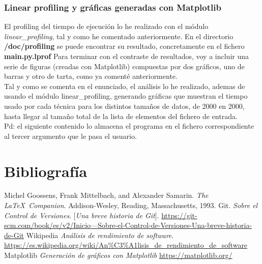 \documentclass[12 pt]{article}
\begin{document}


\subsubsection{Linear profiling y gráficas generadas con Matplotlib}
El profiling del tiempo de ejecución lo he realizado con el módulo \emph{linear\_profiling}, tal y como he comentado anteriormente. En el directorio \textbf{/doc/profiling} se puede encontrar su resultado, concretamente en el fichero \textbf{main.py.lprof}
Para terminar con el contraste de resultados, voy a incluir una serie de figuras (creadas con Matplotlib) compuestas por dos gráficos, uno de barras y otro de tarta, como ya comenté anteriormente.\\

Tal y como se comenta en el enunciado, el análisis lo he realizado, ademas de usando el módulo linear\_profiling, generando gráficas que muestran el tiempo usado por cada técnica para los distintos tamaños de datos, de 2000 en 2000, hasta llegar al tamaño total de la lista de elementos del fichero de entrada.\\

Pd: el siguiente contenido lo almacena el programa en el fichero correspondiente al tercer argumento que le pasa el usuario.\\



\section{Bibliografía}
\begin{thebibliography}{9}
Michel Goossens, Frank Mittelbach, and Alexander Samarin. 
\textit{The \LaTeX\ Companion}. 
Addison-Wesley, Reading, Massachusetts, 1993.
Git.
\textit{Sobre el Control de Versiones}.
[\textit{Una breve historia de Git}]. 
\href{https://git-scm.com/book/es/v2/Inicio---Sobre-el-Control-de-Versiones-Una-breve-historia-de-Git}{https://git-scm.com/book/es/v2/Inicio---Sobre-el-Control-de-Versiones-Una-breve-historia-de-Git}
Wikipedia
\textit{Análisis de rendimiento de software}.
\href{https://es.wikipedia.org/wiki/An%C3%A1lisis_de_rendimiento_de_software}{https://es.wikipedia.org/wiki/An\%C3\%A1lisis\_de\_rendimiento\_de\_software}
Matplotlib
\textit{Generación de gráficos con Matplotlib}
\href{https://matplotlib.org/}{https://matplotlib.org/}
\end{thebibliography}
\end{document}
